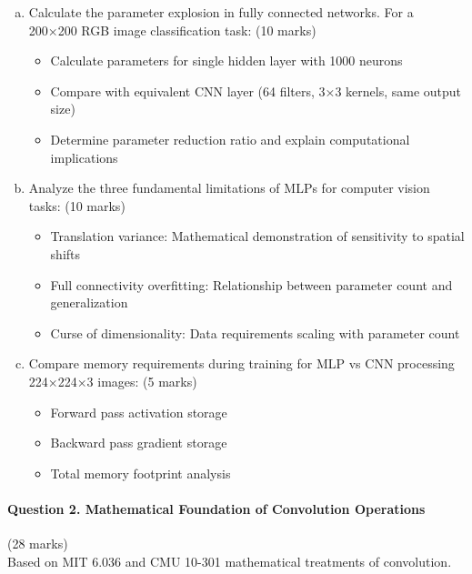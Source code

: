 \documentclass[12pt]{article}
\newcommand{\shortanswer}{\vspace{2cm}}
\newcommand{\mediumanswer}{\vspace{3cm}}
\begin{document}
\begin{enumerate}[(a)]
    \item Calculate the parameter explosion in fully connected networks. For a 200×200 RGB image classification task: \hfill (10 marks)
    \begin{itemize}
        \item Calculate parameters for single hidden layer with 1000 neurons
        \item Compare with equivalent CNN layer (64 filters, 3×3 kernels, same output size)
        \item Determine parameter reduction ratio and explain computational implications
    \end{itemize}
    
    \mediumanswer
    
    \item Analyze the three fundamental limitations of MLPs for computer vision tasks: \hfill (10 marks)
    \begin{itemize}
        \item Translation variance: Mathematical demonstration of sensitivity to spatial shifts
        \item Full connectivity overfitting: Relationship between parameter count and generalization
        \item Curse of dimensionality: Data requirements scaling with parameter count
    \end{itemize}
    
    \mediumanswer
    
    \item Compare memory requirements during training for MLP vs CNN processing 224×224×3 images: \hfill (5 marks)
    \begin{itemize}
        \item Forward pass activation storage
        \item Backward pass gradient storage  
        \item Total memory footprint analysis
    \end{itemize}
    
    \shortanswer
\end{enumerate}

\newpage
\paragraph{Question 2. Mathematical Foundation of Convolution Operations}{{\hfill (28 marks)}}\\
Based on MIT 6.036 and CMU 10-301 mathematical treatments of convolution.
\end{document}
